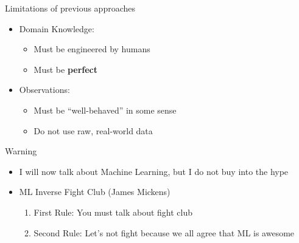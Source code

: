 \documentclass[usenames,dvipsnames]{beamer}
\begin{document}
\begin{frame}[c]{Limitations of previous approaches}
	\begin{itemize}
		\item Domain Knowledge:
		\begin{itemize}
			\item Must be engineered by humans
			\item Must be \textbf{perfect}
		\end{itemize}
		\item Observations:
		\begin{itemize}
			\item Must be ``well-behaved'' in some sense
			\item Do not use raw, real-world data
		\end{itemize}
	\end{itemize}
\end{frame}

{
%
\begin{frame}[c]{Warning}
\begin{itemize} \Large
	\item \color{white} I will now talk about Machine Learning, but I do not buy into the hype
	\item<2-> ML Inverse Fight Club (James Mickens)
	\begin{enumerate} \color{white} \large
		\item<3-> First Rule: You must talk about fight club
		\item<4-> Second Rule: Let's not fight because we all agree that ML is awesome
	\end{enumerate}
\end{itemize}
\end{frame}
}
\end{document}
